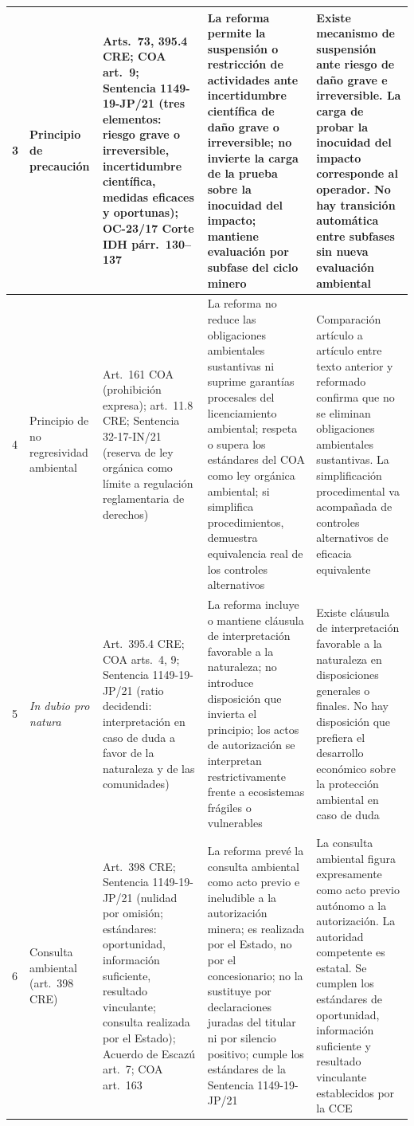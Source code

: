 \begin{longtable}{|p{}|p{}|p{}|p{}|p{}|}
3 &
Principio de precaución &
Arts.\ 73, 395.4 CRE; COA art.\ 9; Sentencia 1149-19-JP/21 (tres elementos: riesgo grave o irreversible, incertidumbre científica, medidas eficaces y oportunas); OC-23/17 Corte IDH párr.\ 130--137 &
La reforma permite la suspensión o restricción de actividades ante incertidumbre científica de daño grave o irreversible; no invierte la carga de la prueba sobre la inocuidad del impacto; mantiene evaluación por subfase del ciclo minero &
Existe mecanismo de suspensión ante riesgo de daño grave e irreversible. La carga de probar la inocuidad del impacto corresponde al operador. No hay transición automática entre subfases sin nueva evaluación ambiental \\
\hline

4 &
Principio de no regresividad ambiental &
Art.\ 161 COA (prohibición expresa); art.\ 11.8 CRE; Sentencia 32-17-IN/21 (reserva de ley orgánica como límite a regulación reglamentaria de derechos) &
La reforma no reduce las obligaciones ambientales sustantivas ni suprime garantías procesales del licenciamiento ambiental; respeta o supera los estándares del COA como ley orgánica ambiental; si simplifica procedimientos, demuestra equivalencia real de los controles alternativos &
Comparación artículo a artículo entre texto anterior y reformado confirma que no se eliminan obligaciones ambientales sustantivas. La simplificación procedimental va acompañada de controles alternativos de eficacia equivalente \\
\hline

5 &
\textit{In dubio pro natura} &
Art.\ 395.4 CRE; COA arts.\ 4, 9; Sentencia 1149-19-JP/21 (ratio decidendi: interpretación en caso de duda a favor de la naturaleza y de las comunidades) &
La reforma incluye o mantiene cláusula de interpretación favorable a la naturaleza; no introduce disposición que invierta el principio; los actos de autorización se interpretan restrictivamente frente a ecosistemas frágiles o vulnerables &
Existe cláusula de interpretación favorable a la naturaleza en disposiciones generales o finales. No hay disposición que prefiera el desarrollo económico sobre la protección ambiental en caso de duda \\
\hline

6 &
Consulta ambiental (art.\ 398 CRE) &
Art.\ 398 CRE; Sentencia 1149-19-JP/21 (nulidad por omisión; estándares: oportunidad, información suficiente, resultado vinculante; consulta realizada por el Estado); Acuerdo de Escazú art.\ 7; COA art.\ 163 &
La reforma prevé la consulta ambiental como acto previo e ineludible a la autorización minera; es realizada por el Estado, no por el concesionario; no la sustituye por declaraciones juradas del titular ni por silencio positivo; cumple los estándares de la Sentencia 1149-19-JP/21 &
La consulta ambiental figura expresamente como acto previo autónomo a la autorización. La autoridad competente es estatal. Se cumplen los estándares de oportunidad, información suficiente y resultado vinculante establecidos por la CCE \\
\hline


\end{longtable}
